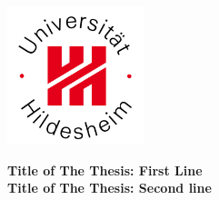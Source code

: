\documentclass[a4paper,12pt]{report}
\begin{document}
\begin{titlepage}

\center %


\vspace{-1cm}
\includegraphics[width=4cm]{logoUHi.jpg}
\vspace{2cm}


{ \Large \bfseries Title of The Thesis: First Line}\\  %
\vspace{0.5cm}
{ \Large \bfseries Title of The Thesis: Second line}\\ %
\vspace{0.5cm}
\vspace{2cm}



\end{titlepage}
\end{document}
